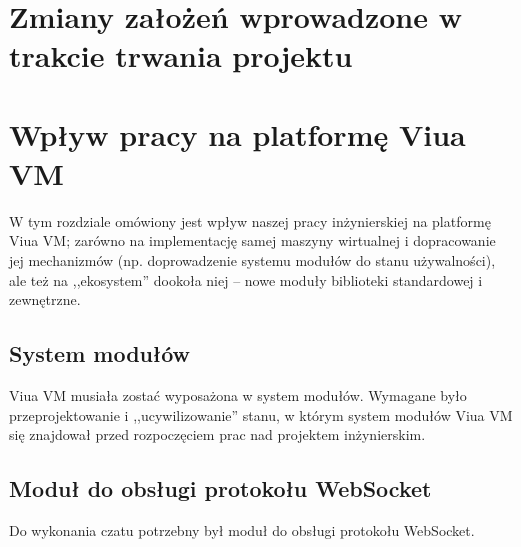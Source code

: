 

\section{Zmiany założeń wprowadzone w trakcie trwania projektu}

\section{Wpływ pracy na platformę Viua VM}

W tym rozdziale omówiony jest wpływ naszej pracy inżynierskiej na platformę Viua VM; zarówno na implementację
samej maszyny wirtualnej i dopracowanie jej mechanizmów (np. doprowadzenie systemu modułów do stanu
używalności), ale też na ,,ekosystem'' dookoła niej -- nowe moduły biblioteki standardowej i zewnętrzne.

\subsection{System modułów}

Viua VM musiała zostać wyposażona w system modułów. Wymagane było przeprojektowanie i ,,ucywilizowanie''
stanu, w którym system modułów Viua VM się znajdował przed rozpoczęciem prac nad projektem inżynierskim.

\subsection{Moduł do obsługi protokołu WebSocket}

Do wykonania czatu potrzebny był moduł do obsługi protokołu WebSocket.
